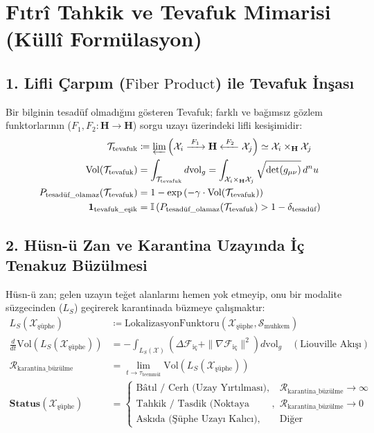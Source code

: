 \documentclass[11pt, a4paper]{article}
\begin{document}
\section{Fıtrî Tahkik ve Tevafuk Mimarisi (Küllî Formülasyon)}

\subsection{1. Lifli Çarpım ($\text{Fiber Product}$) ile Tevafuk İnşası}
Bir bilginin tesadüf olmadığını gösteren Tevafuk; farklı ve bağımsız gözlem funktorlarının ($F_1, F_2 : \mathbf{H} \to \mathbf{H}$) sorgu uzayı üzerindeki lifli kesişimidir:
\begin{align}
\mathcal{T}_{\text{tevafuk}} &\coloneqq \varprojlim \left( \mathcal{X}_i \xrightarrow{\;F_1\;} \mathbf{H} \xleftarrow{\;F_2\;} \mathcal{X}_j \right) \simeq \mathcal{X}_i \times_{\mathbf{H}} \mathcal{X}_j \\
\text{Vol}(\mathcal{T}_{\text{tevafuk}}) &= \int_{\mathcal{T}_{\text{tevafuk}}} d\text{vol}_g = \int_{\mathcal{X}_i \times_{\mathbf{H}} \mathcal{X}_j} \sqrt{\det(g_{\mu\nu})} \, d^n u \\
P_{\text{tesadüf\_olamaz}}(\mathcal{T}_{\text{tevafuk}}) &= 1 - \exp\left( -\gamma \cdot \text{Vol}(\mathcal{T}_{\text{tevafuk}}) \right) \\
\mathbf{1}_{\text{tevafuk\_eşik}} &= \mathbb{I}\left( P_{\text{tesadüf\_olamaz}}(\mathcal{T}_{\text{tevafuk}}) > 1 - \delta_{\text{tesadüf}} \right)
\end{align}

\subsection{2. Hüsn-ü Zan ve Karantina Uzayında İç Tenakuz Büzülmesi}
Hüsn-ü zan; gelen uzayın teğet alanlarını hemen yok etmeyip, onu bir modalite süzgecinden ($L_S$) geçirerek karantinada büzmeye çalışmaktır:
\begin{align}
L_S(\mathcal{X}_{\text{şüphe}}) &\coloneqq \text{LokalizasyonFunktoru}(\mathcal{X}_{\text{şüphe}}, \mathcal{S}_{\text{muhkem}}) \\
\frac{d}{dt} \text{Vol}(L_S(\mathcal{X}_{\text{şüphe}})) &= -\int_{L_S(\mathcal{X})} \left( \Delta \mathcal{F}_{\text{iç}} + \|\nabla \mathcal{F}_{\text{iç}}\|^2 \right) d\text{vol}_g \quad (\text{Liouville Akışı}) \\
\mathcal{R}_{\text{karantina\_büzülme}} &= \lim_{t \to \tau_{\text{teemmül}}} \text{Vol}(L_S(\mathcal{X}_{\text{şüphe}})) \\
\mathbf{Status}(\mathcal{X}_{\text{şüphe}}) &= 
\begin{cases}
\text{Bâtıl / Cerh (Uzay Yırtılması)}, & \mathcal{R}_{\text{karantina\_büzülme}} \to \infty \\
\text{Tahkik / Tasdik (Noktaya Büzülme)}, & \mathcal{R}_{\text{karantina\_büzülme}} \to 0 \\
\text{Askıda (Şüphe Uzayı Kalıcı)}, & \text{Diğer}
\end{cases}
\end{align}
\end{document}
